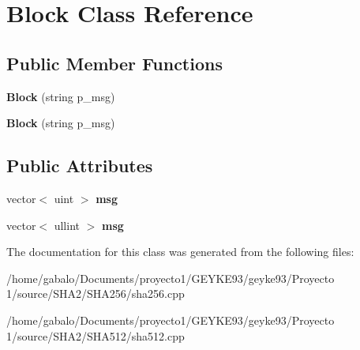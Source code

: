 \section{Block Class Reference}
\label{class_block}
\subsection*{Public Member Functions}
\begin{DoxyCompactItemize}
\item 
{\bfseries Block} (string p\-\_\-msg)\label{class_block_a34e166318967515bc5af08a98ada7bd2}

\item 
{\bfseries Block} (string p\-\_\-msg)\label{class_block_a34e166318967515bc5af08a98ada7bd2}

\end{DoxyCompactItemize}
\subsection*{Public Attributes}
\begin{DoxyCompactItemize}
\item 
vector$<$ uint $>$ {\bfseries msg}\label{class_block_ab7200d3ac2acd00dd813c9ad2ce8d3f0}

\item 
vector$<$ ullint $>$ {\bfseries msg}\label{class_block_aafb09820f3512a59c250dee562518e3f}

\end{DoxyCompactItemize}


The documentation for this class was generated from the following files\-:\begin{DoxyCompactItemize}
\item 
/home/gabalo/\-Documents/proyecto1/\-G\-E\-Y\-K\-E93/geyke93/\-Proyecto 1/source/\-S\-H\-A2/\-S\-H\-A256/sha256.\-cpp\item 
/home/gabalo/\-Documents/proyecto1/\-G\-E\-Y\-K\-E93/geyke93/\-Proyecto 1/source/\-S\-H\-A2/\-S\-H\-A512/sha512.\-cpp\end{DoxyCompactItemize}
